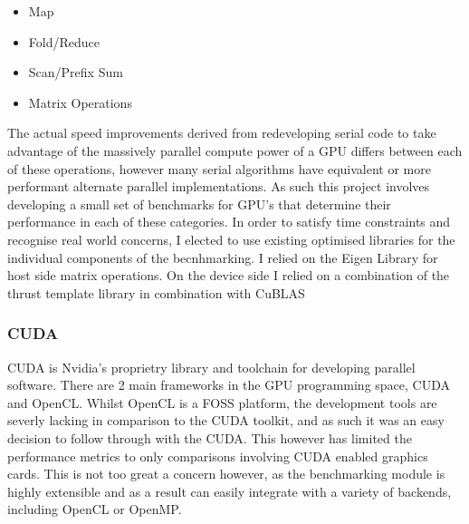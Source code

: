\begin{itemize} 
    \item Map 
    \item Fold/Reduce 
    \item Scan/Prefix Sum 
    \item Matrix Operations
\end{itemize}

The actual speed improvements derived from redeveloping serial code to take advantage of the
massively parallel compute power of a GPU differs between each of these operations, however many
serial algorithms have equivalent or more performant alternate parallel implementations. As such
this project involves developing a small set of benchmarks for GPU's that determine their
performance in each of these categories. In order to satisfy time constraints and recognise real
world concerns, I elected to use existing optimised libraries for the individual components of the
becnhmarking. I relied on the Eigen Library \cite{eigen} for host side matrix operations. On the
device side I relied on a combination of the thrust template library \cite{thrust} in combination
with CuBLAS \cite{cublas}

\subsubsection{CUDA} 
CUDA is Nvidia's proprietry library and toolchain for developing parallel
software. There are 2 main frameworks in the GPU programming space, CUDA and OpenCL. Whilst OpenCL
is a FOSS platform, the development tools are severly lacking in comparison to the CUDA toolkit, and
as such it was an easy decision to follow through with the CUDA. This however has limited the
performance metrics to only comparisons involving CUDA enabled graphics cards. This is not too great
a concern however, as the benchmarking module is highly extensible and as a result can easily
integrate with a variety of backends, including OpenCL or OpenMP.
